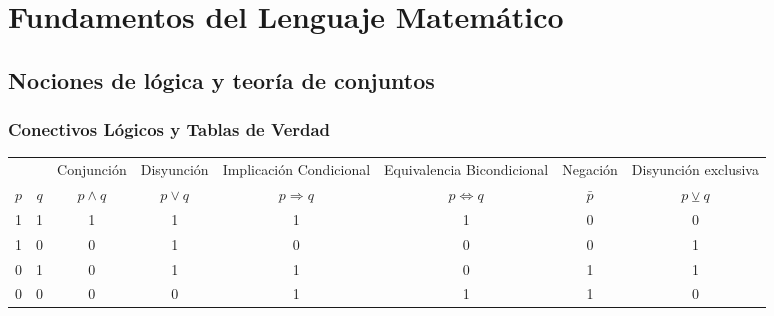 \section{Fundamentos del Lenguaje Matemático}
\subsection{Nociones de lógica y teoría de conjuntos}
\subsubsection{Conectivos Lógicos y Tablas de Verdad}

\begingroup
\setlength{\tabcolsep}{5pt} %
\renewcommand{\arraystretch}{1.5} %
\begin{center}
  \begin{tabular}{c|c|cccccc}
              &           & Conjunción         & Disyunción       & Implicación Condicional & Equivalencia Bicondicional  & Negación        & Disyunción exclusiva \\
    {\bf $p$} & {\bf $q$} & {\bf $p \wedge q$} & {\bf $p \vee q$} & {\bf $p \Rightarrow q$} & {\bf $p \Leftrightarrow q$} & {\bf $\bar{p}$} & {\bf $p \veebar q$}  \\\hline
    1         & 1         & 1                  & 1                & 1                       & 1                           & 0               & 0                    \\
    1         & 0         & 0                  & 1                & 0                       & 0                           & 0               & 1                    \\
    0         & 1         & 0                  & 1                & 1                       & 0                           & 1               & 1                    \\
    0         & 0         & 0                  & 0                & 1                       & 1                           & 1               & 0
  \end{tabular}
\end{center}
\endgroup